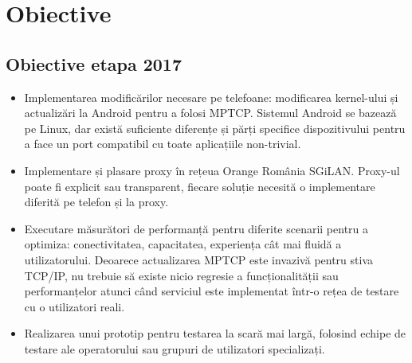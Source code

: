 \chapter{Obiective}
\label{sec:objectives}

\section{Obiective etapa 2017}

\begin{itemize}
\item Implementarea modificărilor necesare pe telefoane: modificarea
kernel-ului și actualizări la Android pentru a folosi
MPTCP. Sistemul Android se bazează pe Linux, dar există suficiente
diferențe și părți specifice dispozitivului pentru a face un port
compatibil cu toate aplicațiile non-trivial.

\item Implementare și plasare proxy în rețeua Orange România
SGiLAN. Proxy-ul poate fi explicit sau transparent, fiecare soluție necesită
o implementare diferită pe telefon și la proxy.


\item Executare măsurători de performanță pentru diferite scenarii
  pentru a optimiza: conectivitatea, capacitatea, experiența cât mai
  fluidă a utilizatorului. Deoarece actualizarea MPTCP este invazivă
  pentru stiva TCP/IP, nu trebuie să existe nicio regresie a
  funcționalității sau performanțelor atunci când serviciul este
  implementat într-o rețea de testare cu o utilizatori reali.


\item Realizarea unui prototip pentru testarea la scară mai largă,
  folosind echipe de testare ale operatorului sau grupuri de
  utilizatori specializați.


\end{itemize}
